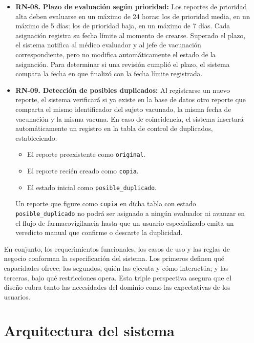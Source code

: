 \begin{itemize}
    \item \textbf{RN-08. Plazo de evaluación según prioridad:} Los reportes de prioridad alta deben evaluarse en un máximo de 24 horas; los de prioridad media, en un máximo de 5 días; los de prioridad baja, en un máximo de 7 días. 
    Cada asignación registra su fecha límite al momento de crearse. 
    Superado el plazo, el sistema notifica al médico evaluador y al jefe de vacunación correspondiente, pero no modifica automáticamente el estado de la asignación. 
    Para determinar si una revisión cumplió el plazo, el sistema compara la fecha en que finalizó con la fecha límite registrada.

    \item \textbf{RN-09. Detección de posibles duplicados:}  
    Al registrarse un nuevo reporte, el sistema verificará si ya existe en la base de datos otro reporte que comparta el mismo identificador del sujeto vacunado, la misma fecha de vacunación y la misma vacuna. 
    En caso de coincidencia, el sistema insertará automáticamente un registro en la tabla de control de duplicados, estableciendo:
    \begin{itemize}
        \item El reporte preexistente como \texttt{original}.
        \item El reporte recién creado como \texttt{copia}.
        \item El estado inicial como \texttt{posible\_duplicado}.
    \end{itemize}
    Un reporte que figure como \texttt{copia} en dicha tabla con estado \texttt{posible\_duplicado} no podrá ser asignado a ningún evaluador ni avanzar en el flujo de farmacovigilancia hasta que un usuario especializado emita un veredicto manual que confirme o descarte la duplicidad.

\end{itemize}

En conjunto, los requerimientos funcionales, los casos de uso y las reglas de negocio conforman la especificación del sistema. Los primeros definen qué capacidades ofrece; los segundos, quién las ejecuta y cómo interactúa; y las terceras, bajo qué restricciones opera. Esta triple perspectiva asegura que el diseño cubra tanto las necesidades del dominio como las expectativas de los usuarios.

\section{Arquitectura del sistema}
\label{section:arquitectura}

